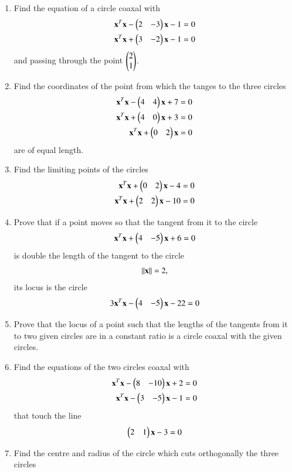 \begin{enumerate}[label=\arabic*.,ref=\thesubsection.\theenumi]
\item Find the equation of a circle coaxal with
\begin{align}
\mathbf{x}^T\mathbf{x}-\begin{pmatrix}2 & -3\end{pmatrix}\mathbf{x}-1 &= 0
\\
\mathbf{x}^T\mathbf{x}+\begin{pmatrix}3 & -2\end{pmatrix}\mathbf{x}-1 &= 0
\end{align}
and passing through the point $\begin{pmatrix}2\\1\end{pmatrix}$.
\item Find the coordinates of the point from which the tanges to the three circles
\begin{align}
\mathbf{x}^T\mathbf{x}-\begin{pmatrix}4 & 4\end{pmatrix}\mathbf{x}+7 = 0
\\
\mathbf{x}^T\mathbf{x}+\begin{pmatrix}4 & 0\end{pmatrix}\mathbf{x}+3 = 0
\\
\mathbf{x}^T\mathbf{x}+\begin{pmatrix}0 & 2\end{pmatrix}\mathbf{x} = 0
\end{align}
are of equal length.
\item Find the limiting points of the circles
\begin{align}
\mathbf{x}^T\mathbf{x}+\begin{pmatrix}0 & 2\end{pmatrix}\mathbf{x}-4 &= 0
\\
\mathbf{x}^T\mathbf{x}+\begin{pmatrix}2 & 2\end{pmatrix}\mathbf{x}-10 &= 0
\end{align}
\item Prove that if a point moves so that the tangent from it to the circle
\begin{align}
\mathbf{x}^T\mathbf{x}+\begin{pmatrix}4 & -5\end{pmatrix}\mathbf{x}+6 = 0
\end{align}
is double the length of the tangent to the circle
\begin{align}
\left\lVert\mathbf{x}\right\rVert = 2,
\end{align}
its locus is the circle
\begin{align}
3\mathbf{x}^T\mathbf{x}-\begin{pmatrix}4 & -5\end{pmatrix}\mathbf{x}-22 = 0
\end{align}
\item Prove that the locus of a point such that the lengths of the tangents from it to two given circles are in a constant ratio is a circle
coaxal with the given circles.
\item Find the equations of the two circles coaxal with
\begin{align}
\mathbf{x}^T\mathbf{x}-\begin{pmatrix}8 & -10\end{pmatrix}\mathbf{x}+2 = 0
\\
\mathbf{x}^T\mathbf{x}-\begin{pmatrix}3 & -5\end{pmatrix}\mathbf{x}-1 = 0
\end{align}
that touch the line
\begin{align}
\begin{pmatrix}2 & 1\end{pmatrix}\mathbf{x}-3 = 0
\end{align}
\item Find the centre and radius of the circle which cuts orthogonally the three circles

\end{enumerate}
